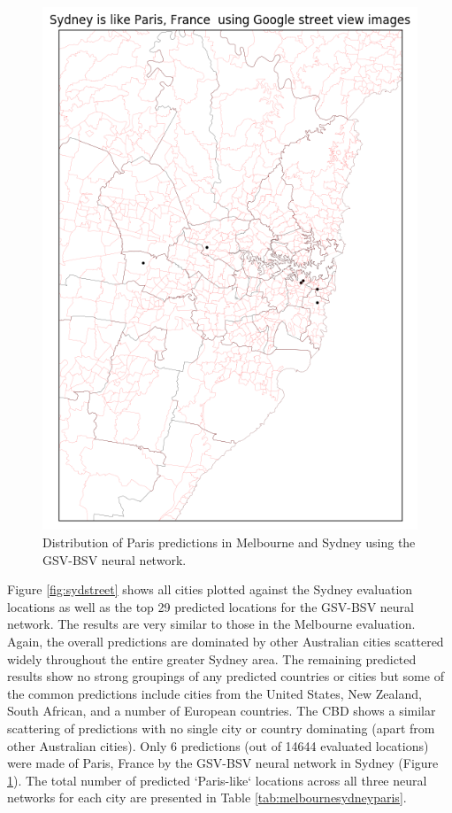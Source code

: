 \documentclass[sageh,times]{sagej}
\begin{document}
\begin{figure}[!htbp]
\includegraphics[scale=0.40]{Images/Sydney_Paris,France-GSV.png} 
\caption{Distribution of Paris predictions in Melbourne and Sydney using the GSV-BSV neural network.}    
 \label{fig:gsv_melsyd_paris}  
\end{figure}


Figure \ref{fig:sydstreet} shows all cities plotted against the Sydney evaluation locations as well as the top 29 predicted locations for the GSV-BSV neural network. The results are very similar to those in the Melbourne evaluation. Again, the overall predictions are dominated by other Australian cities scattered widely throughout the entire greater Sydney area. The remaining predicted results show no strong groupings of any predicted countries or cities but some of the common predictions include cities from the United States, New Zealand, South African, and a number of European countries. The CBD shows a similar scattering of predictions with no single city or country dominating (apart from other Australian cities). Only 6 predictions (out of 14644 evaluated locations) were made of Paris, France by the GSV-BSV neural network in Sydney (Figure \ref{fig:gsv_melsyd_paris}). The total number of predicted `Paris-like` locations across all three neural networks for each city are presented in Table \ref{tab:melbournesydneyparis}.
\end{document}
